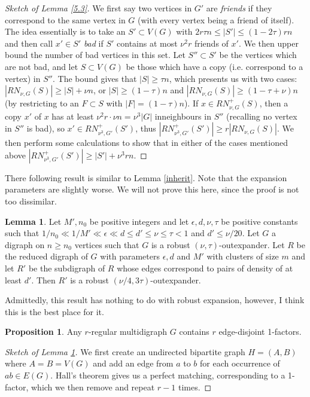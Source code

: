 \documentclass[10pt,letterpaper, reqno]{amsart}
\theoremstyle{definition}
\newtheorem{lemma}[thm]{Lemma}
\newtheorem{prop}[thm]{Proposition}
\numberwithin{equation}{section}
\begin{document}
\begin{proof}[Sketch of Lemma \ref{5.3}]
	 We first say two vertices in $G'$ are \textit{friends} if they correspond to the same vertex in $G$ (with every vertex being a friend of itself). The idea essentially is to take an $S' \subset V(G)$ with $2r\tau n \leq |S'| \leq (1-2\tau)rn$ and then call $x' \in S'$ \textit{bad} if $S'$ contains at most $\nu ^2 r$ friends of $x'$. We then upper bound the number of bad vertices in this set. Let $S'' \subset S'$ be the vertices which are not bad, and let $S \subset V(G)$ be those which have a copy (i.e. correspond to a vertex) in $S''$. The bound gives that $|S| \geq \tau n$, which presents us with two cases: $|RN_{\nu, G}(S)| \geq |S| + \nu n$, or $|S| \geq (1-\tau )n$ and $|RN_{\nu,G}(S)| \geq (1-\tau + \nu )n$ (by restricting to an $F \subset S$ with $|F| =(1-\tau)n$). If $x \in RN_{\nu,G}^+(S)$, then a copy $x'$ of $x$ has at least $\nu^2 r \cdot \nu n = \nu^3|G|$ inneighbours in $S''$ (recalling no vertex in $S''$ is bad), so $x' \in RN_{\nu^3, G'}^+(S')$, thus $|RN_{\nu^3,G'}^+(S')| \geq r|RN_{\nu,G}(S)|$. We then perform some calculations to show that in either of the cases mentioned above $|RN_{\nu^3,G'}^+(S')| \geq |S'| + \nu^3 rn$. 
\end{proof}

\noindent There following result is similar to Lemma \ref{inherit}. Note that the expansion parameters are slightly worse. We will not prove this here, since the proof is not too dissimilar. 

\begin{lemma}\label{Ap3.5}
	Let $M',n_0$ be positive integers and let $\epsilon, d, \nu,\tau$ be positive constants such that $1/n_0 \ll 1/M' \ll \epsilon \ll d \leq d' \leq \nu \leq \tau <1$ and $d' \leq \nu/20$. Let $G$ a digraph on $n\geq n_0$ vertices such that $G$ is a robust $(\nu,\tau)$-outexpander. Let $R$ be the reduced digraph of $G$ with parameters $\epsilon, d$ and $M'$ with clusters of size $m$ and let $R'$ be the subdigraph of $R$ whose edges correspond to pairs of density of at least $d'$. Then $R'$ is a robust $(\nu/4, 3\tau)$-outexpander.
\end{lemma}

\noindent Admittedly, this result has nothing to do with robust expansion, however, I think this is the best place for it.

\begin{prop}\label{rFactorMulti}
	Any $r$-regular multidigraph $G$ contains $r$ edge-disjoint 1-factors.
\end{prop}
\begin{proof}[Sketch of Lemma \ref{rFactorMulti}]
	We first create an undirected bipartite graph $H=(A,B)$ where $A=B=V(G)$ and add an edge from $a$ to $b$ for each occurrence of $ab \in E(G)$. Hall's theorem gives us a perfect matching, corresponding to a 1-factor, which we then remove and repeat $r-1$ times. 
\end{proof}
\end{document}
